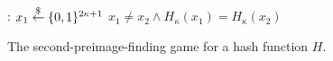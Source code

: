 \begin{figure}[t]
  \begin{algorithm}[H]
    \caption{\label{alg.2preimage-game} The second-preimage-finding
            game for a hash function $H$.}
    \begin{algorithmic}[1]
      :
          \State $x_1 \overset{\$}{\gets} \{0,1\}^{2\kappa+1}$
          \State \Return $x_1 \neq x_2 \wedge H_\kappa(x_1) = H_\kappa(x_2)$
      \EndFunction
    \end{algorithmic}
\end{algorithm}
\end{figure}
